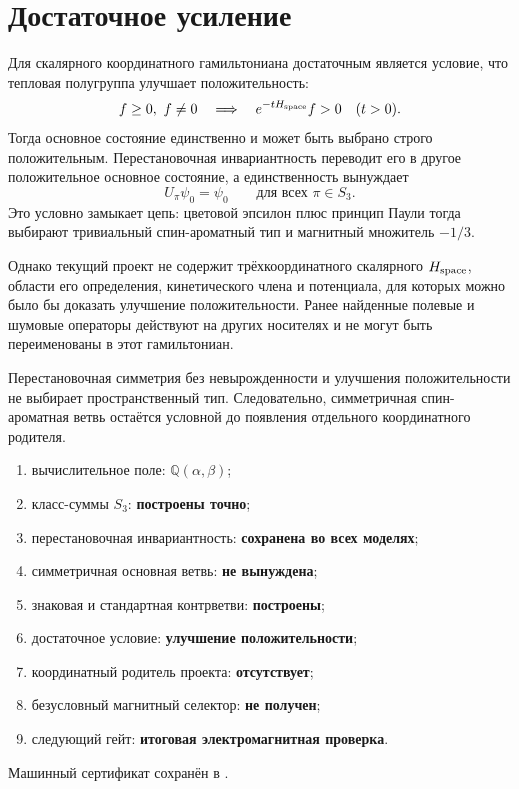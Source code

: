 \section{Достаточное усиление}

Для скалярного координатного гамильтониана достаточным является условие,
что тепловая полугруппа улучшает положительность:
\begin{equation}
 f\ge0,\ f\ne0
 \quad\Longrightarrow\quad
 e^{-tH_{\rm space}}f>0
 \quad(t>0).
 \label{eq:v8-baryon-spatial-positivity-improving-condition}
\end{equation}
Тогда основное состояние единственно и может быть выбрано строго
положительным. Перестановочная инвариантность переводит его в другое
положительное основное состояние, а единственность вынуждает
\begin{equation}
 U_\pi\psi_0=\psi_0
 \qquad\text{для всех }\pi\in S_3.
 \label{eq:v8-baryon-spatial-positive-ground-symmetry}
\end{equation}
Это условно замыкает цепь: цветовой эпсилон плюс принцип Паули тогда
выбирают тривиальный спин-ароматный тип и магнитный множитель $-1/3$.

Однако текущий проект не содержит трёхкоординатного скалярного
$H_{\rm space}$, области его определения, кинетического члена и
потенциала, для которых можно было бы доказать улучшение положительности.
Ранее найденные полевые и шумовые операторы действуют на других носителях
и не могут быть переименованы в этот гамильтониан.

\begin{nogocriterion}
Перестановочная симметрия без невырожденности и улучшения положительности
не выбирает пространственный тип. Следовательно, симметричная
спин-ароматная ветвь остаётся условной до появления отдельного
координатного родителя.
\end{nogocriterion}

\begin{protocol}
\begin{enumerate}
 \item вычислительное поле: \textbf{$\mathbb Q(\alpha,\beta)$};
 \item класс-суммы $S_3$: \textbf{построены точно};
 \item перестановочная инвариантность: \textbf{сохранена во всех моделях};
 \item симметричная основная ветвь: \textbf{не вынуждена};
 \item знаковая и стандартная контрветви: \textbf{построены};
 \item достаточное условие: \textbf{улучшение положительности};
 \item координатный родитель проекта: \textbf{отсутствует};
 \item безусловный магнитный селектор: \textbf{не получен};
 \item следующий гейт: \textbf{итоговая электромагнитная проверка}.
\end{enumerate}
\end{protocol}

Машинный сертификат сохранён в
.